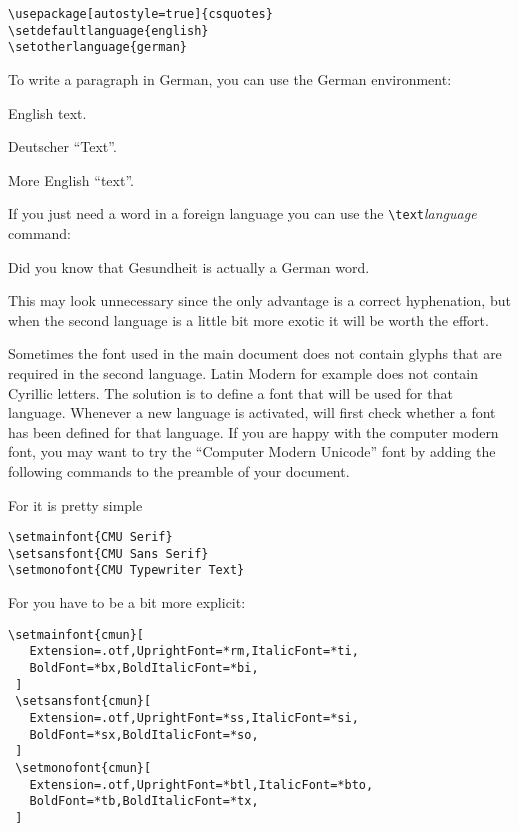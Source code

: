 \begin{lscommand}
\verb|\usepackage[autostyle=true]{csquotes}|\\
\verb|\setdefaultlanguage{english}|\\
\verb|\setotherlanguage{german}|
\end{lscommand}
%
To write a paragraph in German, you can use the German environment:

\begin{example}
English text.
\begin{german}
Deutscher \enquote{Text}.
\end{german}
More English \enquote{text}.
\end{example}

If you just need a word in a foreign language you can use the
\verb|\text|\emph{language} command:

\begin{example}
Did you know that
\textgerman{Gesundheit} is
actually a German word.
\end{example}

This may look unnecessary since the only advantage is a correct hyphenation,
but when the second language is a little bit more exotic it will be worth
the effort.

Sometimes the font used in the main document does not contain glyphs that
are required in the second language. Latin Modern for example does not contain
Cyrillic letters. The solution is to define a font that will be used for
that language. Whenever a new language is activated,  will
first check whether a font has been defined for that language. If you are happy with the computer modern font, you may want to try the \enquote{Computer Modern Unicode} font by adding the following commands to the preamble of your document.

\medskip\noindent For  it is pretty simple
\begin{verbatim}
\setmainfont{CMU Serif}
\setsansfont{CMU Sans Serif}
\setmonofont{CMU Typewriter Text}
\end{verbatim}
\noindent For  you have to be a bit more explicit:
\begin{verbatim}
\setmainfont{cmun}[
   Extension=.otf,UprightFont=*rm,ItalicFont=*ti,
   BoldFont=*bx,BoldItalicFont=*bi,
 ]
 \setsansfont{cmun}[
   Extension=.otf,UprightFont=*ss,ItalicFont=*si,
   BoldFont=*sx,BoldItalicFont=*so,
 ]
 \setmonofont{cmun}[
   Extension=.otf,UprightFont=*btl,ItalicFont=*bto,
   BoldFont=*tb,BoldItalicFont=*tx,
 ]
\end{verbatim}

